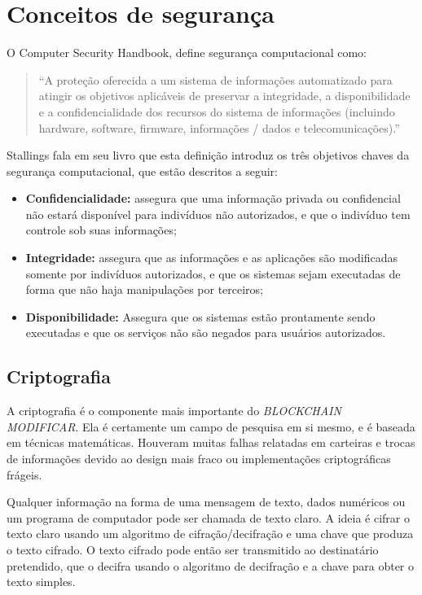 
\section{Conceitos de segurança}

    O Computer Security Handbook\cite{nist95}, define segurança computacional como:
    
     \begin{quote}
        ``A proteção oferecida a um sistema de informações automatizado para atingir os objetivos aplicáveis de preservar a integridade, a disponibilidade e a confidencialidade dos recursos do sistema de informações (incluindo hardware, software, firmware, informações / dados e telecomunicações).''
     \end{quote}
     
     Stallings fala em seu livro \cite{cryptograpy_and_network_stallings} que esta definição introduz os três objetivos chaves da segurança computacional, que estão descritos a seguir:
        
        \begin{itemize}
            \item \textbf{Confidencialidade:} assegura que uma informação privada ou confidencial não estará disponível para indivíduos não autorizados, e que o indivíduo tem controle sob suas informações;
            \item \textbf{Integridade:} assegura que as informações e as aplicações são modificadas somente por indivíduos autorizados, e que os sistemas sejam executadas de forma que não haja manipulações por terceiros;
            \item \textbf{Disponibilidade:} Assegura que os sistemas estão prontamente sendo executadas e que os serviços não são negados para usuários autorizados.
        \end{itemize}

    \subsection{Criptografia}
    
    A criptografia é o componente mais importante do \textit{BLOCKCHAIN MODIFICAR}. Ela é certamente um campo de pesquisa em si mesmo, e é baseada em técnicas matemáticas. Houveram muitas falhas relatadas em carteiras e trocas de informações devido ao design mais fraco ou implementações criptográficas frágeis.\cite{beginnig_blockchain_bikramaditya}
    
    Qualquer informação na forma de uma mensagem de texto, dados numéricos ou um programa de computador pode ser chamada de texto claro. A ideia é cifrar o texto claro usando um algoritmo de cifração/decifração e uma chave que produza o texto cifrado. O texto cifrado pode então ser transmitido ao destinatário pretendido, que o decifra usando o algoritmo de decifração e a chave para obter o texto simples.\cite{beginnig_blockchain_bikramaditya}
    
